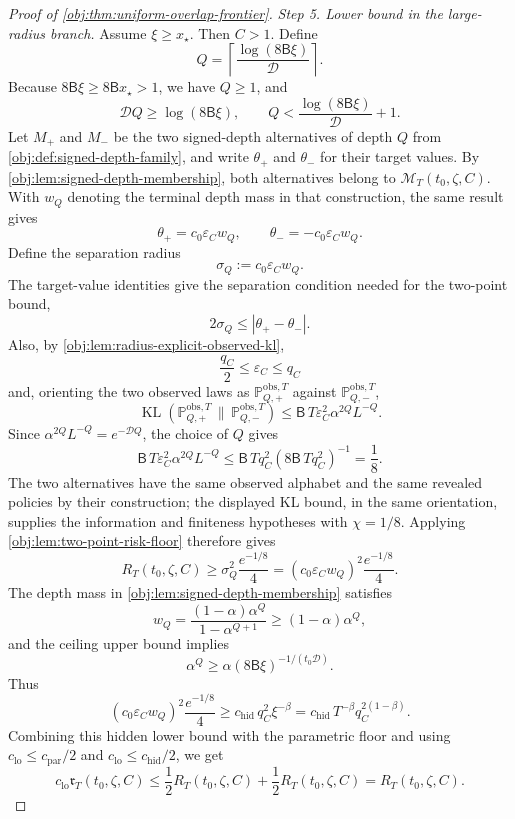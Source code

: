 \documentclass[11pt]{article}
\begin{document}
\begin{proof}[Proof of \cref{obj:thm:uniform-overlap-frontier}]
\emph{Step 5. Lower bound in the large-radius branch.}
Assume \(\xi\ge x_\star\). Then \(C>1\). Define
\[
Q=\left\lceil\frac{\log(8\mathsf B\xi)}{\mathcal D}\right\rceil .
\]
Because \(8\mathsf B\xi\ge8\mathsf Bx_\star>1\), we have \(Q\ge1\), and
\[
\mathcal D Q\ge \log(8\mathsf B\xi),
\qquad
Q<\frac{\log(8\mathsf B\xi)}{\mathcal D}+1 .
\]
Let \(M_+\) and \(M_-\) be the two signed-depth alternatives of depth \(Q\) from
\cref{obj:def:signed-depth-family}, and write \(\theta_+\) and \(\theta_-\) for
their target values.  By \cref{obj:lem:signed-depth-membership}, both alternatives
belong to \(\mathcal M_T(t_0,\zeta,C)\).  With \(w_Q\) denoting the terminal
depth mass in that construction, the same result gives
\[
\theta_+=c_0\varepsilon_C w_Q,
\qquad
\theta_-=-c_0\varepsilon_C w_Q.
\]
Define the separation radius
\[
\sigma_Q:=c_0\varepsilon_C w_Q .
\]
The target-value identities give the separation condition needed for the two-point
bound,
\[
2\sigma_Q\le |\theta_+-\theta_-| .
\]
Also, by \cref{obj:lem:radius-explicit-observed-kl},
\[
\frac{q_C}{2}\le\varepsilon_C\le q_C
\]
and, orienting the two observed laws as \(\mathbb P_{Q,+}^{\mathrm{obs},T}\)
against \(\mathbb P_{Q,-}^{\mathrm{obs},T}\),
\[
\operatorname{KL}(\mathbb P_{Q,+}^{\mathrm{obs},T}\,\|\,\mathbb P_{Q,-}^{\mathrm{obs},T})
\le
\mathsf B\,T\varepsilon_C^2\alpha^{2Q}L^{-Q}.
\]
Since \(\alpha^{2Q}L^{-Q}=e^{-\mathcal DQ}\), the choice of \(Q\) gives
\[
\mathsf B\,T\varepsilon_C^2\alpha^{2Q}L^{-Q}
\le
\mathsf B\,Tq_C^2(8\mathsf B\,Tq_C^2)^{-1}
=
\frac18 .
\]
The two alternatives have the same observed alphabet and the same revealed policies
by their construction; the displayed KL bound, in the same orientation, supplies
the information and finiteness hypotheses with \(\chi=1/8\).  Applying
\cref{obj:lem:two-point-risk-floor} therefore gives
\[
R_T(t_0,\zeta,C)
\ge
\sigma_Q^2\frac{e^{-1/8}}4
=
(c_0\varepsilon_Cw_Q)^2\frac{e^{-1/8}}4 .
\]
The depth mass in \cref{obj:lem:signed-depth-membership} satisfies
\[
w_Q=\frac{(1-\alpha)\alpha^Q}{1-\alpha^{Q+1}}
\ge
(1-\alpha)\alpha^Q,
\]
and the ceiling upper bound implies
\[
\alpha^Q
\ge
\alpha(8\mathsf B\xi)^{-1/(t_0\mathcal D)}.
\]
Thus
\[
(c_0\varepsilon_Cw_Q)^2\frac{e^{-1/8}}4
\ge
c_{\mathrm{hid}}\,q_C^2\xi^{-\beta}
=
c_{\mathrm{hid}}\,T^{-\beta}q_C^{2(1-\beta)}.
\]
Combining this hidden lower bound with the parametric floor and using
\(c_{\mathrm{lo}}\le c_{\mathrm{par}}/2\) and
\(c_{\mathrm{lo}}\le c_{\mathrm{hid}}/2\), we get
\[
c_{\mathrm{lo}}\mathfrak r_T(t_0,\zeta,C)
\le
\frac12 R_T(t_0,\zeta,C)+\frac12 R_T(t_0,\zeta,C)
=
R_T(t_0,\zeta,C).
\] %


\end{proof}
\end{document}
